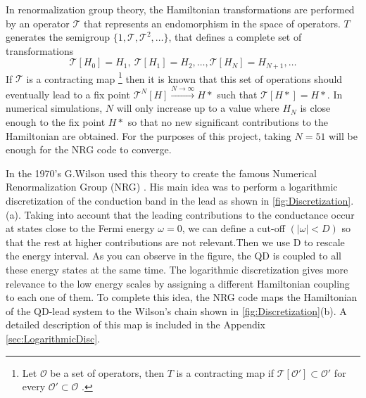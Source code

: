 In renormalization group theory, the Hamiltonian transformations are performed by an operator $\mathcal{T}$ that represents an endomorphism in the space of operators. $T$ generates the semigroup  $\{ 1, \mathcal{T} , \mathcal{T}^2 , \ldots \}$, that defines a complete set of transformations   %
$$ \mathcal{T}[H_0] = H_1, \  \mathcal{T}[H_1] = H_2, \ldots , \mathcal{T}[H_N] = H_{N+1} , \ldots$$
\noindent If $\mathcal{T}$ is a contracting map  \footnote{ Let $\mathcal{O}$ be a set of operators, then $T$ is a contracting map if $\mathcal{T}[\mathcal{O'} ] \subset \mathcal{O'}$ for every $\mathcal{O'} \subset \mathcal{O}$ .} then it is known that this set of operations should eventually lead to a fix point $ \mathcal{T}^N[H] \xrightarrow{N\rightarrow\infty} H*$ such that $\mathcal{T}[H*] = H*$. In numerical simulations, $N $ will only increase up to a value where $H_N$ is close enough to the fix point $H*$ so that no new significant contributions to the Hamiltonian are obtained. For the purposes of this project, taking $N = 51$ will be enough  for the NRG code to converge. 


In the 1970's G.Wilson used this theory to create the famous Numerical Renormalization Group (NRG) \citep{bulla_numerical_2008,wilson_renormalization_1975,krishna-murthy_renormalization-group_1980}. His main idea was to perform a logarithmic discretization of the conduction band in the lead as shown in \ref{fig:Discretization}.(a). Taking into account that the leading contributions to the conductance occur at states close to the Fermi energy $\omega = 0$, we can define a cut-off $( \vert \omega \vert < D)$ so that the rest at higher contributions are not relevant.Then we use D to rescale the energy interval. As you can observe in the figure, the QD is coupled to all these energy states at the same time. The logarithmic discretization gives more relevance to the low energy scales by assigning a different Hamiltonian coupling to each one of them. To complete this idea, the NRG code maps the Hamiltonian of the QD-lead system to the Wilson's chain shown in \ref{fig:Discretization}(b). A detailed description of this map is included in the Appendix \ref{sec:LogarithmicDisc}.

